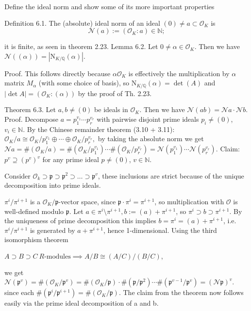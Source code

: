 Define the ideal norm and show some of its more important properties

Definition 6.1. The (absolute) ideal norm of an ideal \((0) \neq a \subset \mathcal{O}_K\) is
\[
\mathcal{N}(a) := (\mathcal{O}_K : a) \in \mathbb{N};
\]

it is finite, as seen in theorem 2.23.
Lemma 6.2. Let \(0 \neq \alpha \in \mathcal{O}_K\). Then we have \(\mathcal{N}((\alpha)) = |\text{N}_{K/\mathbb{Q}}(\alpha)|\).

Proof. This follows directly because \( \alpha \mathcal{O}_K \) is effectively the multiplication by \( \alpha \) matrix \(M_\alpha\) (with some choice of basis), so \(\text{N}_{K/\mathbb{Q}}(\alpha) = \det(A)\) and \(|\det A| = (\mathcal{O}_K : (\alpha))\) by the proof of Th. 2.23.

Theorem 6.3. Let \(a, b \neq (0)\) be ideals in \(\mathcal{O}_K\). Then we have \(\mathcal{N}(ab) = \mathcal{N} a \cdot \mathcal{N} b\).
Proof. Decompose \(a = p_1^{v_1} \cdots p_r^{v_r}\) with pairwise disjoint prime ideals 
\(p_i \neq (0)\), \(v_i \in \mathbb{N}\). By the Chinese remainder theorem (3.10 + 3.11):
\(
\mathcal{O}_K / a \cong \mathcal{O}_K / p_1^{v_1} \oplus \cdots \oplus \mathcal{O}_K / p_r^{v_r},
\)
by taking the absolute norm we get
\(
\mathcal{N} a = \# (\mathcal{O}_K / a) = \# (\mathcal{O}_K / p_1^{v_1}) \cdots \# (\mathcal{O}_K / p_r^{v_r}) = \mathcal{N}(p_1^{v_1}) \cdots \mathcal{N}(p_r^{v_r}).
\)
Claim: \(p^{v} \supseteq (p^{v})^{v}\) for any prime ideal \(p \neq (0)\), \(v \in \mathbb{N}\).

Consider \(\mathcal{O}_k ⊃ \mathfrak{p} ⊃ \mathfrak{p}^2 ⊃ \dots ⊃ \mathfrak{p}^v\), these inclusions are strict because of the unique
decomposition into prime ideals.

\(\pi^i/\pi^{i+1}\) is a \(\mathcal{O}_K/\mathfrak{p}\)-vector space, since \(\mathfrak{p} \cdot \pi^i = \pi^{i+1}\), so multiplication with 
\(\mathcal{O}\) is well-defined modulo \(\mathfrak{p}\).
Let \(a \in \pi^i \setminus \pi^{i+1}, b := (a) + \pi^{i+1}\), so \(\pi^i \supset b \supset \pi^{i+1}\). 
By the uniqueness of prime decomposition this implies \(b = \pi^i = (a) + \pi^{i+1}\), i.e. \(\pi^i/\pi^{i+1}\) is generated by \(a + \pi^{i+1}\), 
hence 1-dimensional. Using the third isomorphism theorem

\(A \supset B \supset C \ R\text{-modules} \implies A/B \cong (A/C)/(B/C)\),

we get
\(\mathcal{N}(\mathfrak{p}^v) = \#(\mathcal{O}_K/\mathfrak{p}^v) = \#(\mathcal{O}_K/\mathfrak{p}) \cdot \#(\mathfrak{p}/\mathfrak{p}^2) \cdots \#(\mathfrak{p}^{v-1}/\mathfrak{p}^v) = (\mathcal{N}\mathfrak{p})^v\).
since each \( \#(\mathfrak{p}^{i}/\mathfrak{p}^{i+1}) = \#(\mathcal{O}_K/\mathfrak{p})\).
The claim from the theorem now follows easily via the prime ideal decomposition of a and b.


